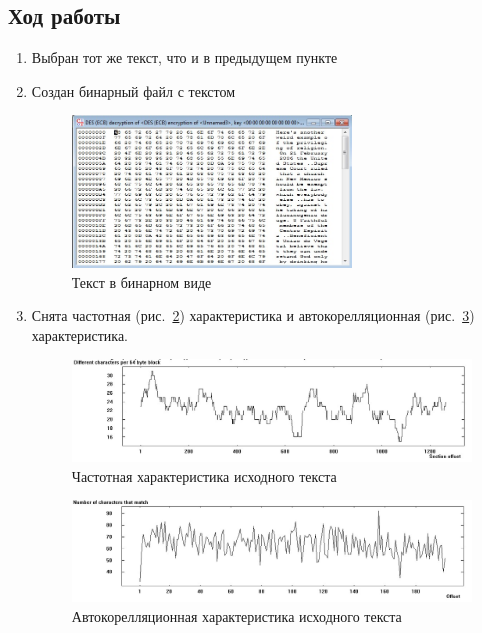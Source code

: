 \documentclass[a4paper, 14pt]{extarticle}
\begin{document}
\subsection{Ход работы}
\begin{enumerate}
    \item Выбран тот же текст, что и в предыдущем пункте
    \item Создан бинарный файл с текстом
    \begin{figure}[h]
        \centering
        \includegraphics[width=0.7\textwidth]{./img/S011.jpg}
        \caption{Текст в бинарном виде}%
        \label{img:3:1}
    \end{figure}
    \item Снята частотная (рис.~\ref{img:3:2}) характеристика и автокорелляционная (рис.~\ref{img:3:3}) характеристика.
    \begin{figure}[h]
        \centering
        \includegraphics[width=\textwidth]{./img/S012.jpg}
        \caption{Частотная характеристика исходного текста}%
        \label{img:3:2}
    \end{figure}
    \begin{figure}[h]
        \centering
        \includegraphics[width=\textwidth]{./img/S013.jpg}
        \caption{Автокорелляционная характеристика исходного текста}%
        \label{img:3:3}

\end{figure}
\end{enumerate}
\end{document}
